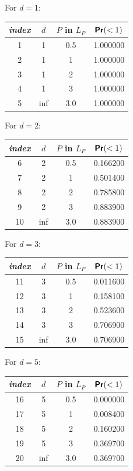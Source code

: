 \documentclass[11pt]{article}
\renewcommand{\Pr}{\textbf{\textsf{Pr}}}
\begin{document}
\begin{center}
For $d = 1$:

\begin{tabular}{| c || c | c | c |}
\hline
\textit{index} & $d$ & $P$ in $L_P$ & $\Pr(<1)$ \\
\hline
\hline
1 & 1 & 0.5 & 1.000000 \\
\hline
2 & 1 & 1 & 1.000000 \\
\hline
3 & 1 & 2 & 1.000000 \\
\hline
4 & 1 & 3 & 1.000000 \\
\hline
5 & inf & 3.0 & 1.000000 \\
\hline
\end{tabular}

For $d = 2$:

\begin{tabular}{| c || c | c | c |}
\hline
\textit{index} & $d$ & $P$ in $L_P$ & $\Pr(<1)$ \\
\hline
\hline
6 & 2 & 0.5 & 0.166200 \\
\hline
7 & 2 & 1 & 0.501400 \\
\hline
8 & 2 & 2 & 0.785800 \\
\hline
9 & 2 & 3 & 0.883900 \\
\hline
10 & inf & 3.0 & 0.883900 \\
\hline
\end{tabular}

For $d = 3$:

\begin{tabular}{| c || c | c | c |}
\hline
\textit{index} & $d$ & $P$ in $L_P$ & $\Pr(<1)$ \\
\hline
\hline
11 & 3 & 0.5 & 0.011600 \\
\hline
12 & 3 & 1 & 0.158100 \\
\hline
13 & 3 & 2 & 0.523600 \\
\hline
14 & 3 & 3 & 0.706900 \\
\hline
15 & inf & 3.0 & 0.706900 \\
\hline
\end{tabular}

For $d = 5$:

\begin{tabular}{| c || c | c | c |}
\hline
\textit{index} & $d$ & $P$ in $L_P$ & $\Pr(<1)$ \\
\hline
\hline
16 & 5 & 0.5 & 0.000000 \\
\hline
17 & 5 & 1 & 0.008400 \\
\hline
18 & 5 & 2 & 0.160200 \\
\hline
19 & 5 & 3 & 0.369700 \\
\hline
20 & inf & 3.0 & 0.369700 \\
\hline
\end{tabular}


\end{center}
\end{document}
